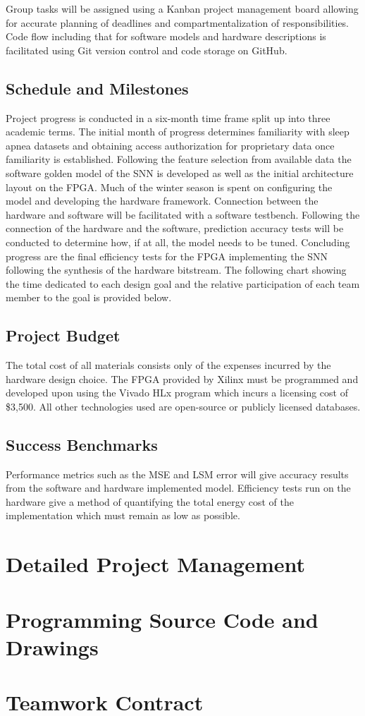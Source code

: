 \documentclass[12pt,titlepage]{article}
\begin{document}
Group tasks will be assigned using a Kanban project management board allowing for accurate planning of deadlines and compartmentalization of responsibilities.
Code flow including that for software models and hardware descriptions is facilitated using Git version control and code storage on GitHub. 

\subsection{Schedule and Milestones}
Project progress is conducted in a six-month time frame split up into three academic terms. The initial month of progress determines familiarity with sleep
apnea datasets and obtaining access authorization for proprietary data once familiarity is established. Following the feature selection from available data
the software golden model of the SNN is developed as well as the initial architecture layout on the FPGA. Much of the winter season is spent on configuring
the model and developing the hardware framework. Connection between the hardware and software will be facilitated with a software testbench. Following the
connection of the hardware and the software, prediction accuracy tests will be conducted to determine how, if at all, the model needs to be tuned. Concluding
progress are the final efficiency tests for the FPGA implementing the SNN following the synthesis of the hardware bitstream. The following chart showing the
time dedicated to each design goal and the relative participation of each team member to the goal is provided below.

\subsection{Project Budget}
The total cost of all materials consists only of the expenses incurred by the hardware design choice. The FPGA provided by Xilinx must be programmed and
developed upon using the Vivado HLx program which incurs a licensing cost of \$3,500. All other technologies used are open-source or publicly licensed databases. 

\subsection{Success Benchmarks}
Performance metrics such as the MSE and LSM error will give accuracy results from the software and hardware implemented model. Efficiency tests run on the
hardware give a method of quantifying the total energy cost of the implementation which must remain as low as possible. 




\clearpage
\begin{appendices}
\section{Detailed Project Management}
\section{Programming Source Code and Drawings}
\section{Teamwork Contract}
\end{appendices}
\end{document}
